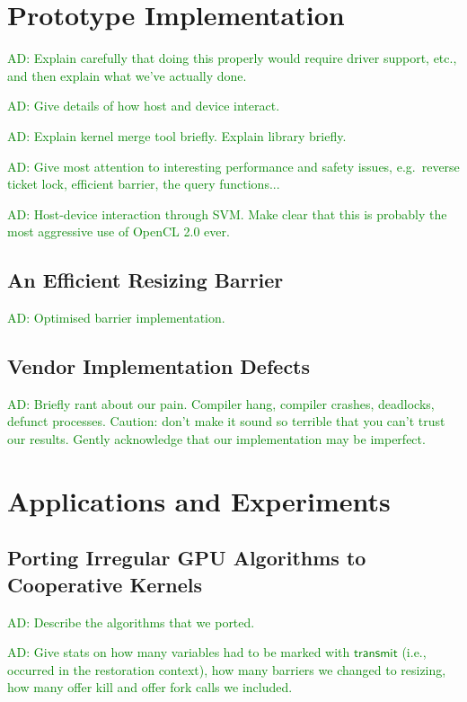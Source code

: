 \documentclass[numbers,nocopyrightspace,10pt]{sigplanconf}
\newcommand{\ADComment}[1]{\textcolor{green}{AD: #1}}
\newcommand{\transmit}{\mathsf{transmit}}
\begin{document}
\section{Prototype Implementation}\label{sec:implementation}

\ADComment{Explain carefully that doing this properly would require
  driver support, etc., and then explain what we've actually done.}

\ADComment{Give details of how host and device interact.}

\ADComment{Explain kernel merge tool briefly.  Explain library briefly.}

\ADComment{Give most attention to interesting performance and safety issues, e.g.\ reverse ticket lock, efficient barrier, the query functions...}

\ADComment{Host-device interaction through SVM.  Make clear that this is probably the most aggressive use of OpenCL 2.0 ever.}

\subsection{An Efficient Resizing Barrier}\label{sec:resizingbarrier}

\ADComment{Optimised barrier implementation.}

\subsection{Vendor Implementation Defects}

\ADComment{Briefly rant about our pain.  Compiler hang, compiler crashes, deadlocks, defunct processes.  Caution: don't make it sound so terrible that you can't trust our results.  Gently acknowledge that our implementation may be imperfect.}


\section{Applications and Experiments}\label{sec:experiments}

\subsection{Porting Irregular GPU Algorithms to Cooperative Kernels}\label{sec:portingalgorithms}

\ADComment{Describe the algorithms that we ported.}

\ADComment{Give stats on how many variables had to be marked with
  $\transmit$ (i.e., occurred in the restoration context), how many barriers we changed to resizing, how many offer kill and offer fork calls we included.}
\end{document}
